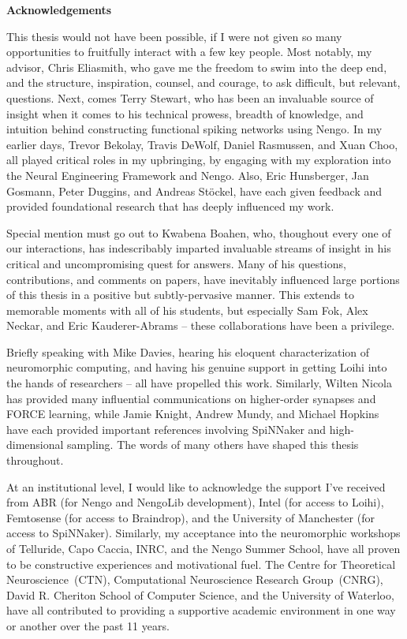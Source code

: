 {}
\begin{center}\textbf{Acknowledgements}\end{center}

This thesis would not have been possible, if I were not given so many opportunities to fruitfully interact with a few key people.
Most notably, my advisor, Chris Eliasmith, who gave me the freedom to swim into the deep end, and the structure, inspiration, counsel, and courage, to ask difficult, but relevant, questions.
Next, comes Terry Stewart, who has been an invaluable source of insight when it comes to his technical prowess, breadth of knowledge, and intuition behind constructing functional spiking networks using Nengo.
In my earlier days, Trevor Bekolay, Travis DeWolf, Daniel Rasmussen, and Xuan Choo, all played critical roles in my upbringing, by engaging with my exploration into the Neural Engineering Framework and Nengo.
Also, Eric Hunsberger, Jan Gosmann, Peter Duggins, and Andreas St{\"o}ckel, have each given feedback and provided foundational research that has deeply influenced my work.

Special mention must go out to Kwabena Boahen, who, thoughout every one of our interactions, has indescribably imparted invaluable streams of insight in his critical and uncompromising quest for answers.
Many of his questions, contributions, and comments on papers, have inevitably influenced large portions of this thesis in a positive but subtly-pervasive manner.
This extends to memorable moments with all of his students, but especially Sam Fok, Alex Neckar, and Eric Kauderer-Abrams -- these collaborations have been a privilege.

Briefly speaking with Mike Davies, hearing his eloquent characterization of neuromorphic computing, and having his genuine support in getting Loihi into the hands of researchers -- all have propelled this work.
Similarly, Wilten Nicola has provided many influential communications on higher-order synapses and FORCE learning, while Jamie Knight, Andrew Mundy, and Michael Hopkins have each provided important references involving SpiNNaker and high-dimensional sampling.
The words of many others have shaped this thesis throughout.

At an institutional level, I would like to acknowledge the support I've received from
ABR (for Nengo and NengoLib development),
Intel (for access to Loihi),
Femtosense (for access to Braindrop),
and the University of Manchester (for access to SpiNNaker).
Similarly, my acceptance into the neuromorphic workshops of Telluride, Capo Caccia, INRC, and the Nengo Summer School, have all proven to be constructive experiences and motivational fuel.
The Centre for Theoretical Neuroscience~(CTN), Computational Neuroscience Research Group~(CNRG), David R. Cheriton School of Computer Science, and the University of Waterloo, have all contributed to providing a supportive academic environment in one way or another over the past 11 years.  


